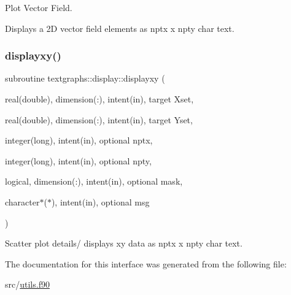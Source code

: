 Plot Vector Field. 

Displays a 2D vector field elements as nptx x npty char text. \mbox{\label{interfacetextgraphs_1_1display_a490c583611a481c4a4ee80a1d8bd2b36}} 
\subsubsection{\texorpdfstring{displayxy()}{displayxy()}}
{\footnotesize\ttfamily subroutine textgraphs\+::display\+::displayxy (\begin{DoxyParamCaption}\item[{real(double), dimension(\+:), intent(in), target}]{Xset,  }\item[{real(double), dimension(\+:), intent(in), target}]{Yset,  }\item[{integer(long), intent(in), optional}]{nptx,  }\item[{integer(long), intent(in), optional}]{npty,  }\item[{logical, dimension(\+:), intent(in), optional}]{mask,  }\item[{character$\ast$($\ast$), intent(in), optional}]{msg }\end{DoxyParamCaption})\hspace{0.3cm}{\ttfamily [private]}}



Scatter plot details/ displays xy data as nptx x npty char text. 



The documentation for this interface was generated from the following file\+:\begin{DoxyCompactItemize}
\item 
src/\hyperlink{utils_8f90}{utils.\+f90}\end{DoxyCompactItemize}
